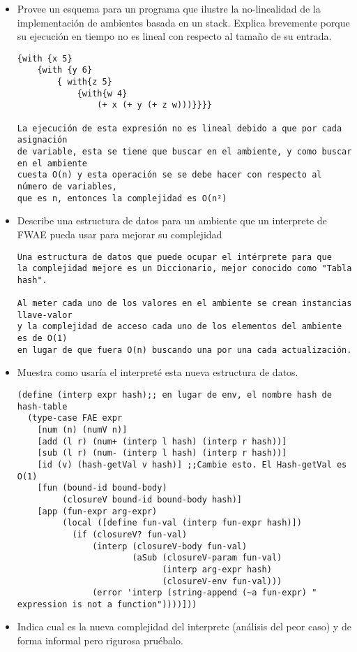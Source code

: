 \documentclass[a4paper]{article}
\begin{document}
\begin{itemize}
\item Provee un esquema para un programa que ilustre la no-linealidad de la implementación de ambientes basada en un stack. Explica brevemente porque su ejecución en tiempo no es lineal con respecto al tamaño de su entrada.

\begin{verbatim}
{with {x 5} 
    {with {y 6}
        { with{z 5} 
            {with{w 4} 
                (+ x (+ y (+ z w)))}}}}

La ejecución de esta expresión no es lineal debido a que por cada asignación 
de variable, esta se tiene que buscar en el ambiente, y como buscar en el ambiente 
cuesta O(n) y esta operación se se debe hacer con respecto al número de variables, 
que es n, entonces la complejidad es O(n²)
\end{verbatim}

\item Describe una estructura de datos para un ambiente que un interprete de FWAE pueda usar para mejorar su
complejidad

\begin{verbatim}
Una estructura de datos que puede ocupar el intérprete para que 
la complejidad mejore es un Diccionario, mejor conocido como "Tabla hash".

Al meter cada uno de los valores en el ambiente se crean instancias llave-valor 
y la complejidad de acceso cada uno de los elementos del ambiente es de O(1)
en lugar de que fuera O(n) buscando una por una cada actualización.
\end{verbatim}

\item Muestra como usaría el interpreté esta nueva estructura de datos.

\begin{verbatim}
(define (interp expr hash);; en lugar de env, el nombre hash de hash-table
  (type-case FAE expr
    [num (n) (numV n)]
    [add (l r) (num+ (interp l hash) (interp r hash))]
    [sub (l r) (num- (interp l hash) (interp r hash))]
    [id (v) (hash-getVal v hash)] ;;Cambie esto. El Hash-getVal es O(1)
    [fun (bound-id bound-body)
         (closureV bound-id bound-body hash)]
    [app (fun-expr arg-expr)
         (local ([define fun-val (interp fun-expr hash)])
           (if (closureV? fun-val)
               (interp (closureV-body fun-val)
                       (aSub (closureV-param fun-val)
                             (interp arg-expr hash)
                             (closureV-env fun-val)))
               (error 'interp (string-append (~a fun-expr) " expression is not a function"))))]))
\end{verbatim}
\item Indica cual es la nueva complejidad del interprete (análisis del peor caso) y de forma informal pero rigurosa pruébalo.


\end{itemize}
\end{document}
